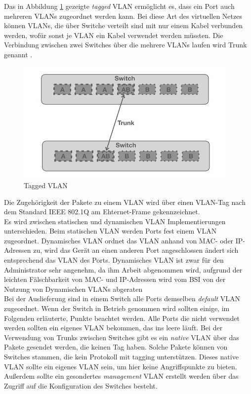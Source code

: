 Das in Abbildung \ref{vlanpak} gezeigte \emph{tagged} VLAN ermöglicht es, dass ein Port auch mehreren VLANs zugeordnet werden kann. Bei  diese Art des virtuellen Netzes können VLANs, die über  Switche verteilt sind mit nur einem Kabel verbunden werden, wofür sonst je VLAN ein Kabel verwendet werden müssten. Die Verbindung zwischen zwei Switches über die mehrere VLANs laufen wird Trunk genannt \cite{cisco14rout}. 

\begin{figure}[h]
\centering
	\includegraphics[width=0.8\linewidth,height=6cm]{vlan.002.jpeg}
	\caption{Tagged VLAN}
	\label{vlanpak}
\end{figure} 

Die Zugehörigkeit der Pakete zu einem VLAN wird über einen VLAN-Tag nach dem Standard  IEEE 802.1Q am Ehternet-Frame gekennzeichnet.\\

Es wird zwischen statischen und dynamischen VLAN Implementierungen unterschieden. Beim statischen VLAN werden Ports fest einem VLAN zugeordnet. Dynamisches VLAN ordnet das VLAN anhand von MAC- oder IP-Adressen zu, wird das Gerät an einen anderen Port angeschlossen ändert sich entsprechend das VLAN des Ports. Dynamisches VLAN ist zwar für den Administrator sehr angenehm, da ihm Arbeit abgenommen wird, aufgrund der leichten Fälschbarkeit von MAC- und IP-Adressen wird vom BSI von der Nutzung von Dynamischen VLANs abgeraten \cite{bsiLogSeg}
\\

Bei der Auslieferung sind in einem Switch alle Ports demselben \emph{default} VLAN zugeordnet. Wenn der Switch in Betrieb genommen wird sollten einige, im Folgenden erläuterte,  Punkte beachtet werden. Alle Ports die nicht verwendet werden sollten ein eigenes VLAN bekommen, das ins leere läuft. Bei der Verwendung von Trunks zwischen Switches gibt es ein \emph{native} VLAN über das Pakete gesendet werden, die keinen Tag haben. Solche Pakete können von Switches stammen, die kein Protokoll mit tagging unterstützen. Dieses native VLAN sollte ein eigenes VLAN sein, um hier keine Angriffspunkte zu bieten. Außerdem sollte ein gesondertes \emph{management} VLAN erstellt werden über das Zugriff auf die Konfiguration des  Switches besteht. 




